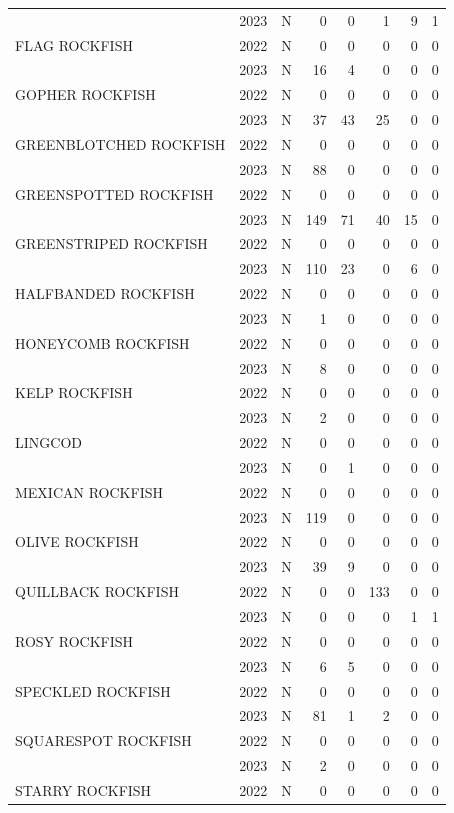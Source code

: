 \documentclass[
  letterpaper,
  DIV=11,
  numbers=noendperiod]{scrartcl}
\begin{document}
\begin{table}
\begin{tabular}[t]{lllrrrrr}
 & 2023 & N & 0 & 0 & 1 & 9 & 1\\
FLAG ROCKFISH & 2022 & N & 0 & 0 & 0 & 0 & 0\\
 & 2023 & N & 16 & 4 & 0 & 0 & 0\\
GOPHER ROCKFISH & 2022 & N & 0 & 0 & 0 & 0 & 0\\
 & 2023 & N & 37 & 43 & 25 & 0 & 0\\
GREENBLOTCHED ROCKFISH & 2022 & N & 0 & 0 & 0 & 0 & 0\\
 & 2023 & N & 88 & 0 & 0 & 0 & 0\\
GREENSPOTTED ROCKFISH & 2022 & N & 0 & 0 & 0 & 0 & 0\\
 & 2023 & N & 149 & 71 & 40 & 15 & 0\\
GREENSTRIPED ROCKFISH & 2022 & N & 0 & 0 & 0 & 0 & 0\\
 & 2023 & N & 110 & 23 & 0 & 6 & 0\\
HALFBANDED ROCKFISH & 2022 & N & 0 & 0 & 0 & 0 & 0\\
 & 2023 & N & 1 & 0 & 0 & 0 & 0\\
HONEYCOMB ROCKFISH & 2022 & N & 0 & 0 & 0 & 0 & 0\\
 & 2023 & N & 8 & 0 & 0 & 0 & 0\\
KELP ROCKFISH & 2022 & N & 0 & 0 & 0 & 0 & 0\\
 & 2023 & N & 2 & 0 & 0 & 0 & 0\\
LINGCOD & 2022 & N & 0 & 0 & 0 & 0 & 0\\
 & 2023 & N & 0 & 1 & 0 & 0 & 0\\
MEXICAN ROCKFISH & 2022 & N & 0 & 0 & 0 & 0 & 0\\
 & 2023 & N & 119 & 0 & 0 & 0 & 0\\
OLIVE ROCKFISH & 2022 & N & 0 & 0 & 0 & 0 & 0\\
 & 2023 & N & 39 & 9 & 0 & 0 & 0\\
QUILLBACK ROCKFISH & 2022 & N & 0 & 0 & 133 & 0 & 0\\
 & 2023 & N & 0 & 0 & 0 & 1 & 1\\
ROSY ROCKFISH & 2022 & N & 0 & 0 & 0 & 0 & 0\\
 & 2023 & N & 6 & 5 & 0 & 0 & 0\\
SPECKLED ROCKFISH & 2022 & N & 0 & 0 & 0 & 0 & 0\\
 & 2023 & N & 81 & 1 & 2 & 0 & 0\\
SQUARESPOT ROCKFISH & 2022 & N & 0 & 0 & 0 & 0 & 0\\
 & 2023 & N & 2 & 0 & 0 & 0 & 0\\
STARRY ROCKFISH & 2022 & N & 0 & 0 & 0 & 0 & 0\\

\end{tabular}
\end{table}
\end{document}
